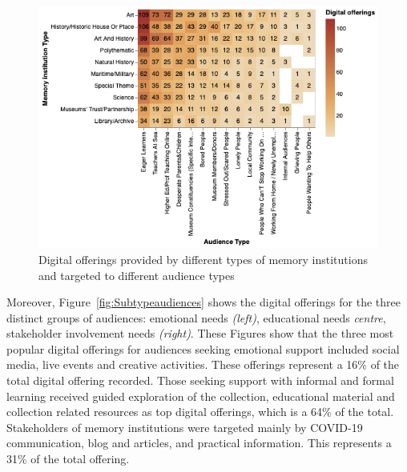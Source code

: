\documentclass{egpubl}
\begin{document}
\begin{figure}[h]
  \centering
  \includegraphics[width=\linewidth]{images/audiencesboth.png}
  \caption{\label{fig:MTypeAudiences}
           Digital offerings provided by different types of memory institutions and targeted to different audience types}
\end{figure}







Moreover, Figure~\ref{fig:Subtypeaudiences} shows the digital offerings for the three distinct groups of audiences: emotional needs  \emph{(left)}, educational needs \emph{centre}, stakeholder involvement needs \emph{(right)}. These Figures show that the three most popular digital offerings for audiences seeking emotional support included social media, live events and creative activities. These offerings represent a 16\% of the total digital offering recorded. Those seeking support with informal and formal learning received guided exploration of the collection, educational material and collection related resources as top digital offerings, which is a 64\% of the total. Stakeholders of memory institutions were targeted mainly by COVID-19 communication, blog and articles, and practical information. This represents a 31\% of the total offering.
\end{document}
